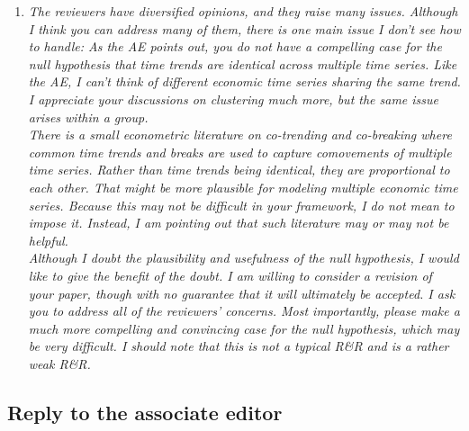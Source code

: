 \documentclass[a4paper,12pt]{article}
\begin{document}
\begin{enumerate}[label=\arabic*.,leftmargin=0.6cm]


\item \textit{The reviewers have diversified opinions, and they raise many issues. Although I think you can address many of them, there is one main issue I don’t see how to handle: As the AE points out, you do not have a compelling case for the null hypothesis that time trends are identical across multiple time series. Like the AE, I can’t think of different economic time series sharing the same trend.  I appreciate your discussions on clustering much more, but the same issue arises within a group. \\
There is a small econometric literature on co-trending and co-breaking where common time trends and breaks are used to capture comovements of multiple time series. Rather than time trends being identical, they are proportional to each other. That might be more plausible for modeling multiple economic time series. Because this may not be difficult in your framework, I do not mean to impose it.  Instead, I am pointing out that such literature may or may not be helpful. \\
Although I doubt the plausibility and usefulness of the null hypothesis, I would like to give the benefit of the doubt. I am willing to consider a revision of your paper, though with no guarantee that it will ultimately be accepted. I ask you to address all of the reviewers' concerns. Most importantly, please make a much more compelling and convincing case for the null hypothesis, which may be very difficult. I should note that this is not a typical R\&R and is a rather weak R\&R.
}


\end{enumerate}



\subsection*{Reply to the associate editor}
\end{document}
